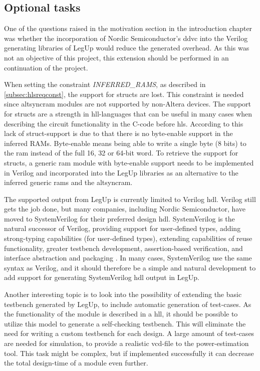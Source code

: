 \subsection{Optional tasks}

One of the questions raised in the motivation section in the introduction chapter was whether the incorporation of Nordic Semiconductor's \gls{ddvc} into the Verilog generating libraries of LegUp would reduce the generated overhead. As this was not an objective of this project, this extension should be performed in an continuation of the project.

When setting the constraint \textit{INFERRED\_RAMS}, as described in \cref{subsec:hlsreqconst}, the support for structs are lost. This constraint is needed since altsyncram modules are not supported by non-Altera devices. The support for structs are a strength in \gls{hll}-languages that can be useful in many cases when describing the circuit functionality in the C-code before \gls{hls}. According to \cite{legupconst} this lack of struct-support is due to that there is no byte-enable support in the inferred RAMs. Byte-enable means being able to write a single byte (8 bits) to the \gls{ram} instead of the full 16, 32 or 64-bit word. To retrieve the support for structs, a generic \gls{ram} module with byte-enable support needs to be implemented in Verilog and incorporated into the LegUp libraries as an alternative to the inferred generic \gls{ram}s and the altsyncram. 

The supported output from LegUp is currently limited to Verilog \gls{hdl}. Verilog still gets the job done, but many companies, including Nordic Semiconductor, have moved to SystemVerilog for their preferred design \gls{hdl}. SystemVerilog is the natural successor of Verilog, providing support for user-defined types, adding strong-typing capabilities (for user-defined types), extending capabilities of reuse functionality, greater testbench development, assertion-based verification, and interface abstraction and packaging \cite{bailey2003comparison}. In many cases, SystemVerilog use the same syntax as Verilog, and it should therefore be a simple and natural development to add support for generating SystemVerilog \gls{hdl} output in LegUp.

Another interesting topic is to look into the possibility of extending the basic testbench generated by LegUp, to include automatic generation of test-cases. As the functionality of the module is described in a \gls{hll}, it should be possible to utilize this model to generate a self-checking testbench. This will eliminate the need for writing a custom testbench for each design. A large amount of test-cases are needed for simulation, to provide a realistic \gls{vcd}-file to the power-estimation tool. This task might be complex, but if implemented successfully it can decrease the total design-time of a module even further.